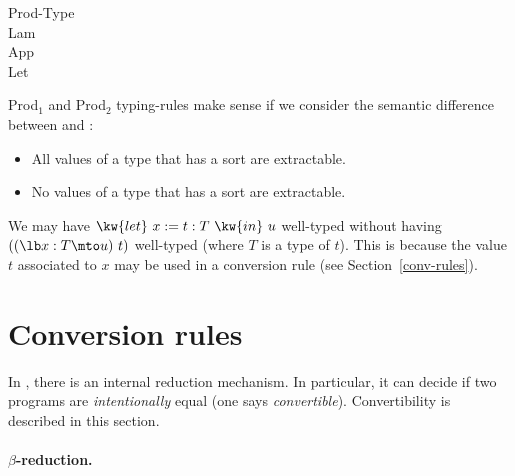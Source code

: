 \begin{description}
\item[Prod-Type]  
\item[Lam] 
\item[App]
\item[Let] 
\end{description}

\Rem Prod$_1$ and Prod$_2$ typing-rules make sense if we consider the semantic
difference between {\Prop} and {\Set}:
\begin{itemize}
  \item All values of a type that has a sort {\Set} are extractable.
  \item No values of a type that has a sort {\Prop} are extractable.
\end{itemize}

\Rem We may have $\kw{let}~x:=t:T~\kw{in}~u$
well-typed without having $((\lb x:T\mto u)~t)$ well-typed (where
$T$ is a type of $t$). This is because the value $t$ associated to $x$
may be used in a conversion rule (see Section~\ref{conv-rules}).

\section[Conversion rules]{Conversion rules
\label{conv-rules}}

In \CIC, there is an internal reduction mechanism. In particular, it
can decide if two programs are {\em intentionally} equal (one
says {\em convertible}). Convertibility is described in this section.

\paragraph[$\beta$-reduction.]{$\beta$-reduction.\label{beta}}


